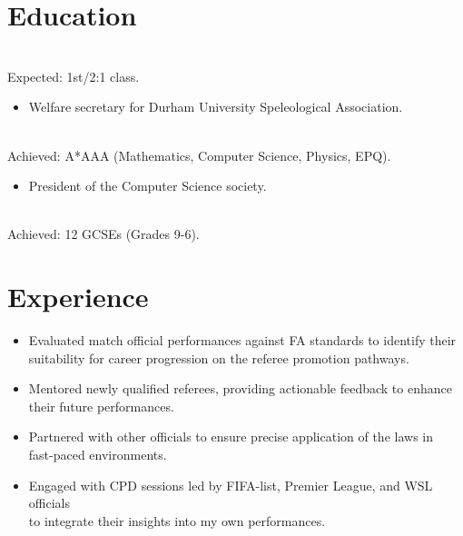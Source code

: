 \section*{Education}

\\Expected: 1st/2:1 class.
\begin{itemize}
    \item Welfare secretary for Durham University Speleological Association.
\end{itemize}

\\Achieved: A*AAA (Mathematics, Computer Science, Physics, EPQ).
\begin{itemize}
    \item President of the Computer Science society.
\end{itemize}

\\Achieved: 12 GCSEs (Grades 9-6).

\section*{Experience}

\begin{itemize}
    \item Evaluated match official performances against FA standards to identify their \\ suitability for career progression on the referee promotion pathways.
    \item Mentored newly qualified referees, providing actionable feedback to enhance \\ their future performances.
\end{itemize}

\begin{itemize}
    \item Partnered with other officials to ensure precise application of the laws in \\ fast-paced environments.
    \item Engaged with CPD sessions led by FIFA-list, Premier League, and WSL officials \\ to integrate their insights into my own performances.
\end{itemize}

